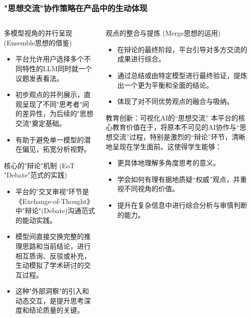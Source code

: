 \documentclass[aspectratio=169]{beamer} %
\begin{document}
\begin{frame}
\frametitle{"思想交流"协作策略在产品中的生动体现}
\begin{columns}
\begin{column}{0.5\textwidth}
\begin{block}{多模型视角的并行呈现 (Ensemble思想的借鉴)}
\begin{itemize}
    \item 平台允许用户选择多个不同特性的LLM同时就一个议题发表看法。
    \item 初步观点的并列展示，直观呈现了不同"思考者"间的差异性，为后续的"思想交流"奠定基础。
    \item 有助于避免单一模型的潜在偏见，拓宽分析视野。
\end{itemize}
\end{block}

\begin{block}{核心的"辩论"机制 (EoT "Debate"范式的实践)}
\begin{itemize}
    \item 平台的"交叉审视"环节是《Exchange-of-Thought》中"辩论"(Debate)沟通范式的能动实践。
    \item 模型间直接交换完整的推理思路和当前结论，进行相互质询、反驳或补充，生动模拟了学术研讨的交互过程。
    \item 这种"外部洞察"的引入和动态交互，是提升思考深度和结论质量的关键。
\end{itemize}
\end{block}
\end{column}
\begin{column}{0.5\textwidth}
\begin{block}{观点的整合与提炼 (Merge思想的运用)}
\begin{itemize}
    \item 在辩论的最终阶段，平台引导对多方交流的成果进行综合。
    \item 通过总结或由特定模型进行最终验证，提炼出一个更为平衡和全面的结论。
    \item 体现了对不同优势观点的融合与吸纳。
\end{itemize}
\end{block}

\begin{alertblock}{教育创新：可视化AI的“思想交流”}
本平台的核心教育价值在于，将原本不可见的AI协作与“思想交流”过程，特别是激烈的“辩论”环节，清晰地呈现在学生面前。这使得学生能够：
\begin{itemize}
    \item 更具体地理解多角度思考的意义。
    \item 学会如何有理有据地质疑“权威”观点，并重视不同视角的价值。
    \item 提升在复杂信息中进行综合分析与审慎判断的能力。
\end{itemize}
\end{alertblock}
\end{column}
\end{columns}
\end{frame}
\end{document}
